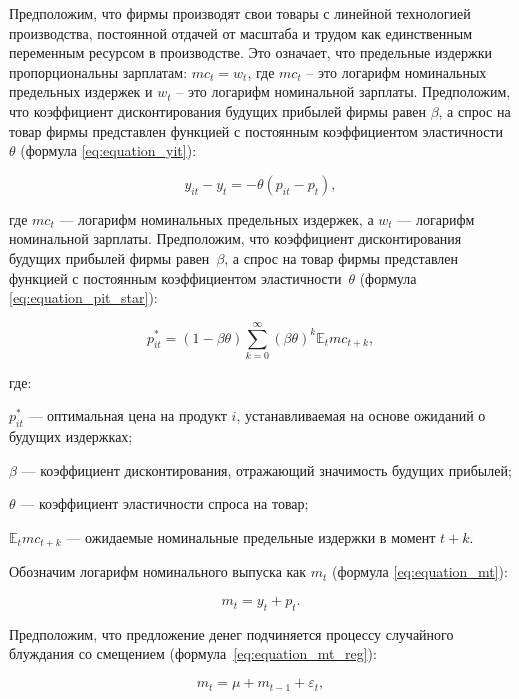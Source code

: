 Предположим, что фирмы производят свои товары с линейной технологией производства, постоянной отдачей от масштаба и трудом как единственным переменным ресурсом в производстве. Это означает, что предельные издержки пропорциональны зарплатам: $mc_t=w_t$, где $mc_t$ -- это логарифм номинальных предельных издержек и $w_t$ -- это логарифм номинальной зарплаты. Предположим, что коэффициент дисконтирования будущих прибылей фирмы равен $\beta$, а спрос на товар фирмы представлен функцией с постоянным коэффициентом эластичности $\theta$ (формула \eqref{eq:equation_yit}):

\begin{equation}
	\label{eq:equation_yit}
	y_{it} - y_t = -\theta (p_{it} - p_t),
\end{equation}
\par
где $mc_t$ — логарифм номинальных предельных издержек, а $w_t$ — логарифм номинальной зарплаты. Предположим, что коэффициент дисконтирования будущих прибылей фирмы равен~$\beta$, а спрос на товар фирмы представлен функцией с постоянным коэффициентом эластичности~$\theta$ (формула \eqref{eq:equation_pit_star}):

\begin{equation}
	\label{eq:equation_pit_star}
	p_{it}^* = (1 - \beta \theta) \sum_{k=0}^{\infty} (\beta \theta)^k \mathbb{E}_t mc_{t+k},
\end{equation}

где:
\par
$p_{it}^\ast$ — оптимальная цена на продукт $i$, устанавливаемая на основе ожиданий о будущих издержках;
\par
$\beta$ — коэффициент дисконтирования, отражающий значимость будущих прибылей;
\par
$\theta$ — коэффициент эластичности спроса на товар;
\par
$\mathbb{E}_t mc_{t+k}$ — ожидаемые номинальные предельные издержки в момент $t+k$.

Обозначим логарифм номинального выпуска как \( m_t \) (формула \eqref{eq:equation_mt}):

\begin{equation}
	\label{eq:equation_mt}
	m_t = y_t + p_t.
\end{equation}

Предположим, что предложение денег подчиняется процессу случайного блуждания со смещением (формула~\eqref{eq:equation_mt_reg}):


\begin{equation}
	\label{eq:equation_mt_reg}
	m_t = \mu + m_{t-1} + \varepsilon_t,
\end{equation}


